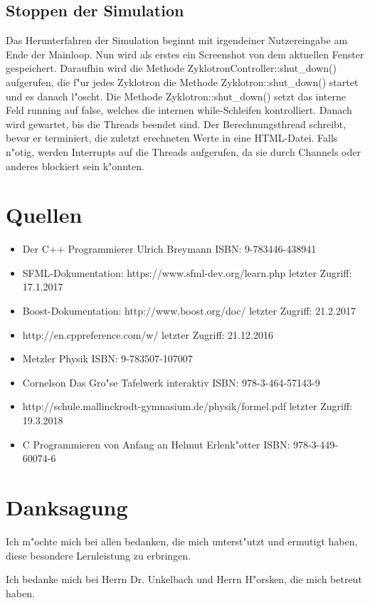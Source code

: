 \documentclass[14pt, a4paper]{report}
\begin{document}
\section{Stoppen der Simulation}
Das Herunterfahren der Simulation beginnt mit irgendeiner 
Nutzereingabe am Ende der Mainloop. Nun wird
als erstes ein Screenshot von dem aktuellen Fenster gespeichert. Daraufhin wird die Methode
ZyklotronController::shut\_down() aufgerufen, die f"ur jedes Zyklotron die Methode Zyklotron::shut\_down()
startet und es danach l"oscht. Die Methode Zyklotron::shut\_down() setzt das interne Feld running
auf false, welches die internen while-Schleifen kontrolliert. Danach wird gewartet, bis die Threads
beendet sind. Der Berechnungsthread schreibt, bevor er terminiert, die zuletzt erechneten Werte in
eine HTML-Datei. Falls n"otig, werden Interrupts auf die Threads aufgerufen, da sie durch Channels
oder anderes blockiert sein k"onnten.

\chapter{Quellen}
\begin{itemize}

\item Der C++ Programmierer Ulrich Breymann ISBN: 9-783446-438941
\item SFML-Dokumentation: https://www.sfml-dev.org/learn.php letzter Zugriff: 17.1.2017
\item Boost-Dokumentation: http://www.boost.org/doc/ letzter Zugriff: 21.2.2017
\item http://en.cppreference.com/w/ letzter Zugriff: 21.12.2016
\item Metzler Physik ISBN: 9-783507-107007
\item Cornelson Das Gro"se Tafelwerk interaktiv ISBN: 978-3-464-57143-9
\item http://schule.mallinckrodt-gymnasium.de/physik/formel.pdf letzter Zugriff: 19.3.2018
\item C Programmieren von Anfang an Helmut Erlenk"otter ISBN: 978-3-449-60074-6
\end{itemize}

\chapter{Danksagung}
Ich m"ochte mich bei allen bedanken, die mich unterst"utzt und ermutigt haben, diese
besondere Lernleistung zu erbringen.

Ich bedanke mich bei Herrn Dr. Unkelbach und Herrn H"orsken, 
die mich betreut haben. 
\end{document}

